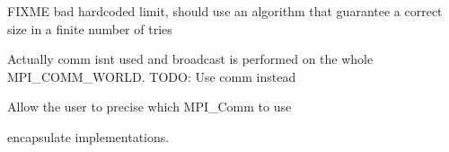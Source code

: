 \begin{DoxyRefList}
\label{todo__todo000024}%
%
F\+I\+X\+ME bad hardcoded limit, should use an algorithm that guarantee a correct size in a finite number of tries  
\item[Member \mbox{\hyperlink{group___parallel_ga43a042b471a84b187c77bca43368db6a}{mpi::broadcast}} (communicator \&comm, int value, int root)]\label{todo__todo000032}%
%
Actually comm isn\textquotesingle{}t used and broadcast is performed on the whole M\+P\+I\+\_\+\+C\+O\+M\+M\+\_\+\+W\+O\+R\+LD. T\+O\+DO\+: Use comm instead  
\item[Member \mbox{\hyperlink{classmpi_1_1communicator_a0e17d90b784f078d3e22a488290cb6aa}{mpi::communicator::communicator}} ()]\label{todo__todo000033}%
%
Allow the user to precise which M\+P\+I\+\_\+\+Comm to use  
\item[File \mbox{\hyperlink{eo_2src_2serial_2_utils_8h}{Utils.h}} ]\label{todo__todo000034}%
%
encapsulate implementations.
\end{DoxyRefList}